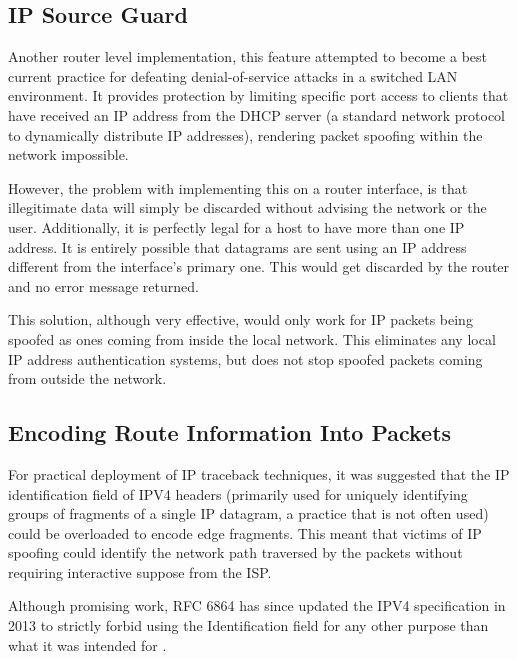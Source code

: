 \documentclass[12pt,twoside]{article}
\begin{document}
\subsection{IP Source Guard \cite{ipsourceguard}}

Another router level implementation, this feature attempted to become a best current practice for defeating denial-of-service attacks in a switched LAN environment. It provides protection by limiting specific port access to clients that have received an IP address from the DHCP server (a standard network protocol to dynamically distribute IP addresses), rendering packet spoofing within the network impossible. 

However, the problem with implementing this on a router interface, is that illegitimate data will simply be discarded without advising the network or the user. Additionally, it is perfectly legal for a host to have more than one IP address. It is entirely possible that datagrams are sent using an IP address different from the interface's primary one. This would get discarded by the router and no error message returned.

This solution, although very effective, would only work for IP packets being spoofed as ones coming from inside the local network. This eliminates any local IP address authentication systems, but does not stop spoofed packets coming from outside the network.

\subsection{Encoding Route Information Into Packets \cite{traceback}}
For practical deployment of IP traceback techniques, it was suggested that the IP identification field of IPV4 headers (primarily used for uniquely identifying groups of fragments of a single IP datagram, a practice that is not often used) could be overloaded to encode edge fragments. This meant that victims of IP spoofing could identify the network path traversed by the packets without requiring interactive suppose from the ISP.

Although promising work, RFC 6864 has since updated the IPV4 specification in 2013 to strictly forbid using the Identification field for any other purpose than what it was intended for \cite{rfc6864}.

\end{document}
